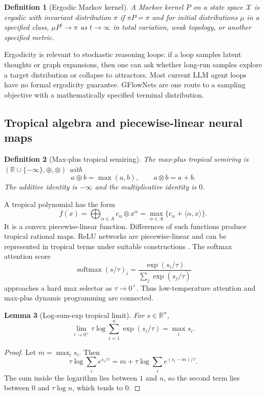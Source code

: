\documentclass[11pt]{article}
\newtheorem{definition}{Definition}[section]
\newtheorem{lemma}[definition]{Lemma}
\newcommand{\R}{\mathbb{R}}
\newcommand{\calX}{\mathcal{X}}
\newcommand{\softmax}{\operatorname{softmax}}
\newcommand{\1}{\mathbf{1}}
\begin{document}
\begin{definition}[Ergodic Markov kernel]
A Markov kernel $P$ on a state space $\calX$ is ergodic with invariant distribution $\pi$ if $\pi P=\pi$ and for initial distributions $\mu$ in a specified class, $\mu P^t\to\pi$ as $t\to\infty$ in total variation, weak topology, or another specified metric.
\end{definition}

Ergodicity is relevant to stochastic reasoning loops: if a loop samples latent thoughts or graph expansions, then one can ask whether long-run samples explore a target distribution or collapse to attractors. Most current LLM agent loops have no formal ergodicity guarantee. GFlowNets are one route to a sampling objective with a mathematically specified terminal distribution.

\subsection{Tropical algebra and piecewise-linear neural maps}

\begin{definition}[Max-plus tropical semiring]
The max-plus tropical semiring is $(\R\cup\{-\infty\},\oplus,\otimes)$ with
\[
a\oplus b=\max(a,b),\qquad a\otimes b=a+b.
\]
The additive identity is $-\infty$ and the multiplicative identity is $0$.
\end{definition}

A tropical polynomial has the form
\[
f(x)=\bigoplus_{\alpha\in A} c_\alpha\otimes x^\alpha
=\max_{\alpha\in A}\{c_\alpha+\langle\alpha,x\rangle\}.
\]
It is a convex piecewise-linear function. Differences of such functions produce tropical rational maps. ReLU networks are piecewise-linear and can be represented in tropical terms under suitable constructions \cite{ZhangTropical2018,Brandenburg2024}. The softmax attention score
\[
\softmax(s/\tau)_i=\frac{\exp(s_i/\tau)}{\sum_j\exp(s_j/\tau)}
\]
approaches a hard max selector as $\tau\to0^+$. Thus low-temperature attention and max-plus dynamic programming are connected.

\begin{lemma}[Log-sum-exp tropical limit]
For $s\in\R^n$,
\[
\lim_{\tau\to0^+}\tau\log\sum_{i=1}^n \exp(s_i/\tau)=\max_i s_i.
\]
\end{lemma}
\begin{proof}
Let $m=\max_i s_i$. Then
\[
\tau\log\sum_i e^{s_i/\tau}=m+\tau\log\sum_i e^{(s_i-m)/\tau}.
\]
The sum inside the logarithm lies between $1$ and $n$, so the second term lies between $0$ and $\tau\log n$, which tends to $0$.
\end{proof}
\end{document}
